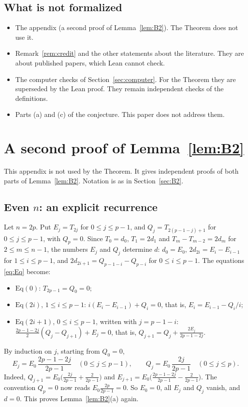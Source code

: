 \documentclass[11pt]{amsart}
\theoremstyle{plain}
\theoremstyle{definition}
\theoremstyle{remark}
\numberwithin{equation}{section}
\newcommand{\Eq}{\mathrm{Eq}}
\begin{document}
\subsection{What is not formalized}
\begin{itemize}
\item The appendix (a second proof of Lemma~\ref{lem:B2}). The Theorem does not use it.
\item Remark~\ref{rem:credit} and the other statements about the literature. They are
about published papers, which Lean cannot check.
\item The computer checks of Section~\ref{sec:computer}. For the Theorem they are
superseded by the Lean proof. They remain independent checks of the definitions.
\item Parts (a) and (c) of the conjecture. This paper does not address them.
\end{itemize}

\appendix
\section{A second proof of \texorpdfstring{Lemma~\ref{lem:B2}}{Lemma 12}}\label{app:alt}

This appendix is not used by the Theorem. It gives independent proofs of both parts of
Lemma~\ref{lem:B2}. Notation is as in Section~\ref{sec:B2}.

\subsection{Even \texorpdfstring{\(n\)}{n}: an explicit recurrence}
Let \(n=2p\). Put \(E_j=T_{2j}\) for \(0\le j\le p-1\), and \(Q_j=T_{2(p-1-j)+1}\) for
\(0\le j\le p-1\), with \(Q_p=0\). Since \(T_0=d_0\), \(T_1=2d_1\) and
\(T_m-T_{m-2}=2d_m\) for \(2\le m\le n-1\), the numbers \(E_j\) and \(Q_j\) determine
\(d\): \(d_0=E_0\), \(2d_{2i}=E_i-E_{i-1}\) for \(1\le i\le p-1\), and
\(2d_{2i+1}=Q_{p-1-i}-Q_{p-i}\) for \(0\le i\le p-1\). The equations \eqref{eq:Eq}
become:
\begin{itemize}
\item \(\Eq(0)\): \(T_{2p-1}=Q_0=0\);
\item \(\Eq(2i)\), \(1\le i\le p-1\): \(i(E_i-E_{i-1})+Q_i=0\), that is,
\(E_i=E_{i-1}-Q_i/i\);
\item \(\Eq(2i+1)\), \(0\le i\le p-1\), written with \(j=p-1-i\):
\(\frac{2p-1-2j}{2}(Q_j-Q_{j+1})+E_j=0\), that is,
\(Q_{j+1}=Q_j+\frac{2E_j}{2p-1-2j}\).
\end{itemize}
By induction on \(j\), starting from \(Q_0=0\),
\[
E_j=E_0\,\frac{2p-1-2j}{2p-1}\quad(0\le j\le p-1),\qquad
Q_j=E_0\,\frac{2j}{2p-1}\quad(0\le j\le p).
\]
Indeed, \(Q_{j+1}=E_0\bigl(\frac{2j}{2p-1}+\frac{2}{2p-1}\bigr)\) and
\(E_{j+1}=E_0\bigl(\frac{2p-1-2j}{2p-1}-\frac{2}{2p-1}\bigr)\). The convention
\(Q_p=0\) now reads \(E_0\frac{2p}{2p-1}=0\). So \(E_0=0\), all \(E_j\) and \(Q_j\)
vanish, and \(d=0\). This proves Lemma~\ref{lem:B2}(a) again.
\end{document}
